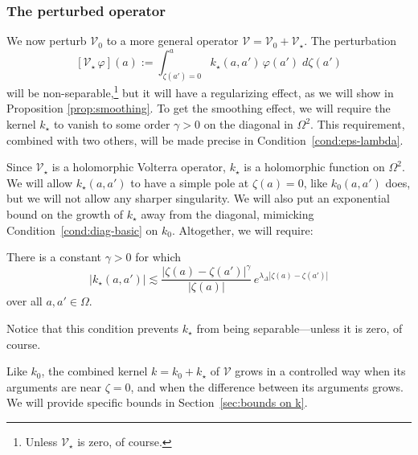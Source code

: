 \documentclass{article}
\makeatletter
\theoremstyle{definition}
\theoremstyle{plain}
\newcommand{\condconst}[2]{\item[($\text{\textsc{#1}} \mid #2$)]\protected@edef\@currentlabel{$\text{\textsc{#1}} \mid #2$}}
\newcommand{\volterra}{\mathcal{V}}
\newcommand{\hardpart}{\mathcal{V}_0}
\newcommand{\softpart}{\mathcal{V}_\star}
\newcommand{\hardker}{k_0}
\newcommand{\softker}{k_\star}
\newcommand{\domain}{\Omega}
\newenvironment{revtwo}{\color{revred}}{\color{black}}
\newcommand{\revtwotext}[1]{\textcolor{revred}{#1}}
\newenvironment{revtwo}{}{}
\newcommand{\revtwotext}[1]{#1}
\makeatother
\begin{document}
\subsubsection{The perturbed operator}\label{setting:perturbed}

We now perturb $\hardpart$ to a more general operator $\volterra = \hardpart +\softpart$. \begin{revtwo}The perturbation
\[ [\softpart\,\varphi](a) := \int_{\zeta(a') = 0}^a \softker(a, a')\,\varphi(a')\;d\zeta(a') \]
will be non-separable,\end{revtwo}\footnote{Unless $\softpart$ is zero, of course.} but it will have a regularizing effect, as we will show in Proposition \ref{prop:smoothing}. To get the smoothing effect, we will require \revtwotext{the kernel $\softker$} to vanish to some order $\gamma > 0$ on the diagonal in $\domain^2$. This requirement, combined with two others, will be made precise in Condition~\eqref{cond:eps-lambda}.

Since $\softpart$ is a holomorphic Volterra operator, $\softker$ is a holomorphic function on $\domain^2$. We will allow $\softker(a, a')$ to have a simple pole at $\zeta(a) = 0$, like $\hardker(a, a')$ does, but we will not allow any sharper singularity. We will also put an exponential bound on the growth of $\softker$ away from the diagonal, mimicking Condition~\eqref{cond:diag-basic} on $\hardker$. Altogether, we will require:
\begin{conditions}
\condconst{diag$_\star$}{\gamma, \lambda_\Delta}\label{cond:eps-lambda} There is a constant $\gamma > 0$ for which
\[ |\softker(a, a')| \lesssim\frac{|\zeta(a)-\zeta(a')|^\gamma}{|\zeta(a)|}\,e^{\lambda_\Delta|\zeta(a)-\zeta(a')|}\]
over all $a, a' \in \domain$.
\end{conditions}
Notice that this condition prevents $\softker$ from being separable---unless it is zero, of course.

Like $\hardker$, the combined kernel $k = \hardker + \softker$ of $\volterra$ grows in a controlled way when its arguments are near $\zeta = 0$, and when the difference between its arguments grows. We will provide specific bounds in Section~\ref{sec:bounds on k}. 
\end{document}
